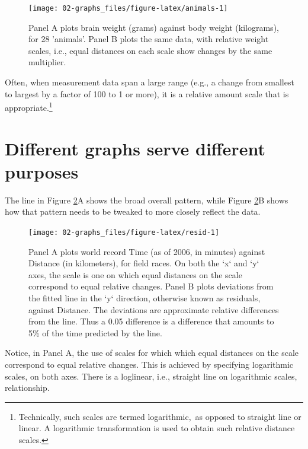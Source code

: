 \documentclass[
  10pt,
  b5paper]{book}
\begin{document}
\begin{figure}[H]

{\centering \texttt{[image: 02-graphs\_files/figure-latex/animals-1]} 

}

\caption{Panel A plots brain weight (grams) against body weight 
(kilograms), for 28 'animals'.  Panel B plots the same data, 
with relative weight scales, i.e., equal distances on each scale 
show changes by the same multiplier.}\label{fig:animals}
\end{figure}

Often, when measurement data span a large range (e.g., a change
from smallest to largest by a factor of 100 to 1 or more),
it is a relative amount scale that is appropriate.\footnote{Technically,
  such scales are termed logarithmic,~as opposed to straight
  line or linear. A logarithmic transformation is used to
  obtain such relative distance scales.}

\hypertarget{track}{%
\section{Different graphs serve different purposes}\label{track}}

The line in Figure \ref{fig:resid}A shows the broad overall
pattern, while Figure \ref{fig:resid}B shows how that pattern
needs to be tweaked to more closely reflect the data.

\begin{figure}[H]

{\centering \texttt{[image: 02-graphs\_files/figure-latex/resid-1]} 

}

\caption{Panel A plots world record Time (as of 2006, in minutes)
against Distance (in kilometers), for field races.  On both the
`x` and `y` axes, the scale is one on which equal distances on 
the scale correspond to equal relative changes.  Panel B plots
deviations from the fitted line in the `y` direction, otherwise
known as residuals, against Distance. The deviations are
approximate relative differences from the line.  Thus a 0.05
difference is a difference that amounts to 5\% of the time
predicted by the line.}\label{fig:resid}
\end{figure}

Notice, in Panel A, the use of scales for which which equal
distances on the scale correspond to equal relative changes.
This is achieved by specifying logarithmic scales, on both
axes. There is a loglinear, i.e., straight line on
logarithmic scales, relationship.
\end{document}

